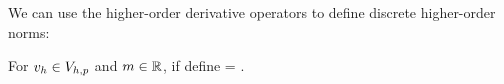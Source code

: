 
We can use the higher-order derivative operators to define discrete higher-order norms:

For $v_{h} \in V_{h,p}$ and $m \in \mathbb R$, if define
\beqs
\Nshn{\vh} = .
\eeqs
\ede




{}


